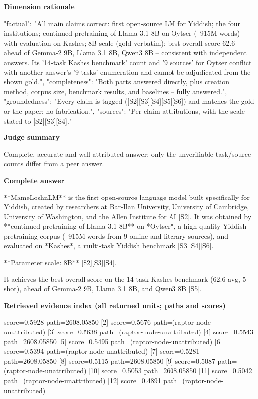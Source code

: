 \documentclass[10pt]{article}
\begin{document}
\textbf{Dimension rationale}
\begin{EvidenceText}
{
  "factual": "All main claims correct: first open-source LM for Yiddish; the four institutions; continued pretraining of Llama 3.1 8B on Oytser (~915M words) with evaluation on Kashes; 8B scale (gold-verbatim); best overall score 62.6 ahead of Gemma-2 9B, Llama 3.1 8B, Qwen3 8B -- consistent with independent answers. Its '14-task Kashes benchmark' count and '9 sources' for Oytser conflict with another answer's '9 tasks' enumeration and cannot be adjudicated from the shown gold.",
  "completeness": "Both parts answered directly, plus creation method, corpus size, benchmark results, and baselines -- fully answered.",
  "groundedness": "Every claim is tagged ([S2][S3][S4][S5][S6]) and matches the gold or the paper; no fabrication.",
  "sources": "Per-claim attributions, with the scale stated to [S2][S3][S4]."
}
\end{EvidenceText}

\textbf{Judge summary}
\begin{EvidenceText}
Complete, accurate and well-attributed answer; only the unverifiable task/source counts differ from a peer answer.
\end{EvidenceText}

\textbf{Complete answer}
\begin{AnswerText}
**MameLoshnLM** is the first open-source language model built specifically for Yiddish, created by researchers at Bar-Ilan University, University of Cambridge, University of Washington, and the Allen Institute for AI [S2]. It was obtained by **continued pretraining of Llama 3.1 8B** on *Oytser*, a high-quality Yiddish pretraining corpus (~915M words from 9 online and literary sources), and evaluated on *Kashes*, a multi-task Yiddish benchmark [S3][S4][S6].

**Parameter scale: 8B** [S2][S3][S4].

It achieves the best overall score on the 14-task Kashes benchmark (62.6 avg, 5-shot), ahead of Gemma-2 9B, Llama 3.1 8B, and Qwen3 8B [S5].
\end{AnswerText}

\textbf{Retrieved evidence index (all returned units; paths and scores) }
\begin{EvidenceText}
[1] score=0.5928 path=2608.05850
[2] score=0.5676 path=(raptor-node-unattributed)
[3] score=0.5638 path=(raptor-node-unattributed)
[4] score=0.5543 path=2608.05850
[5] score=0.5495 path=(raptor-node-unattributed)
[6] score=0.5394 path=(raptor-node-unattributed)
[7] score=0.5281 path=2608.05850
[8] score=0.5115 path=2608.05850
[9] score=0.5087 path=(raptor-node-unattributed)
[10] score=0.5053 path=2608.05850
[11] score=0.5042 path=(raptor-node-unattributed)
[12] score=0.4891 path=(raptor-node-unattributed)
\end{EvidenceText}
\end{document}
